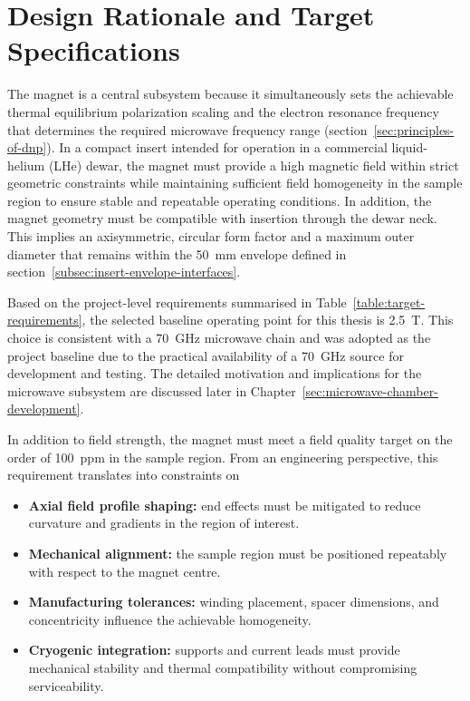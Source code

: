 \documentclass[FM,DP,EN,twoside]{tulthesis}
\begin{document}
\section{Design Rationale and Target Specifications}
\label{sec:magnet-rationale-specifications}
The magnet is a central subsystem because it simultaneously sets the achievable thermal equilibrium polarization scaling and the electron resonance frequency that determines the required microwave frequency range (section~\ref{sec:principles-of-dnp}). In a compact insert intended for operation in a commercial liquid-helium (LHe) dewar, the magnet must provide a high magnetic field within strict geometric constraints while maintaining sufficient field homogeneity in the sample region to ensure stable and repeatable operating conditions. In addition, the magnet geometry must be compatible with insertion through the dewar neck. This implies an axisymmetric, circular form factor and a maximum outer diameter that remains within the \SI{50}{\milli\meter} envelope defined in section~\ref{subsec:insert-envelope-interfaces}.

Based on the project-level requirements summarised in Table~\ref{table:target-requirements}, the selected baseline operating point for this thesis is \SI{2.5}{\tesla}. This choice is consistent with a \SI{70}{\giga\hertz} microwave chain and was adopted as the project baseline due to the practical availability of a \SI{70}{\giga\hertz} source for development and testing. The detailed motivation and implications for the microwave subsystem are discussed later in Chapter~\ref{sec:microwave-chamber-development}.

In addition to field strength, the magnet must meet a field quality target on the order of \SI{100}{ppm} in the sample region. From an engineering perspective, this requirement translates into constraints on
\begin{itemize}
  \item \textbf{Axial field profile shaping:} end effects must be mitigated to reduce curvature and gradients in the region of interest.
  \item \textbf{Mechanical alignment:} the sample region must be positioned repeatably with respect to the magnet centre.
  \item \textbf{Manufacturing tolerances:} winding placement, spacer dimensions, and concentricity influence the achievable homogeneity.
  \item \textbf{Cryogenic integration:} supports and current leads must provide mechanical stability and thermal compatibility without compromising serviceability.
\end{itemize}
\end{document}
